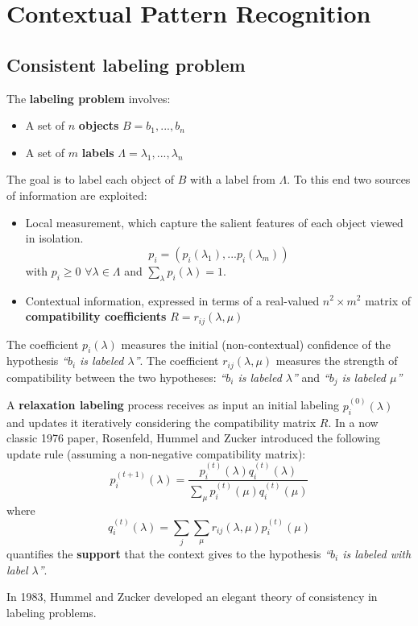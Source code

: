 \section{Contextual Pattern Recognition}
\subsection{Consistent labeling problem}
The \textbf{labeling problem} involves:
\begin{itemize}
\item A set of $n$ \textbf{objects} $B = {b_1, ..., b_n}$
\item A set of $m$ \textbf{labels} $\Lambda = {\lambda_1, ..., \lambda_n}$
\end{itemize}
The goal is to label each object of $B$ with a label from $\Lambda$. To this end two
sources of information are exploited:
\begin{itemize}
\item Local measurement, which capture the salient features of each object viewed in
  isolation. $$ p_i = (p_i(\lambda_1), ... p_i(\lambda_m)) $$ with $p_i \ge 0$ $\forall
  \lambda \in \Lambda$ and $\sum_{\lambda}p_i(\lambda) = 1$.
\item Contextual information, expressed in terms of a real-valued $n^2 \times m^2$
  matrix of \textbf{compatibility coefficients} $R = { r_{ij}(\lambda, \mu) }$
\end{itemize}
The coefficient $p_i(\lambda)$ measures the initial (non-contextual) confidence of
the hypothesis \textit{``$b_i$ is labeled $\lambda$''}.
The coefficient $r_{ij}(\lambda, \mu)$ measures the strength of compatibility between
the two hypotheses: \textit{``$b_i$ is labeled $\lambda$''} and \textit{``$b_j$ is labeled
  $\mu$''}

A \textbf{relaxation labeling} process receives as input an initial labeling
$p_i^{(0)}(\lambda)$ and updates it iteratively considering the compatibility matrix
$R$. In a now classic 1976 paper, Rosenfeld, Hummel and Zucker introduced the
following update rule (assuming a non-negative compatibility matrix):
$$ p_i^{(t+1)}(\lambda) = \frac{ p_i^{(t)}(\lambda)q_i^{(t)}(\lambda)}
{\sum_\mu p_i^{(t)}(\mu)q_i^{(t)}(\mu)} $$
where
$$ q_i^{(t)}(\lambda) = \sum_j \sum_\mu r_{ij}(\lambda, \mu) p_i^{(t)}(\mu) $$
quantifies the \textbf{support} that the context gives to the hypothesis
\textit{``$b_i$ is labeled with label $\lambda$''}.

In 1983, Hummel and Zucker developed an elegant theory of consistency in labeling
problems.

